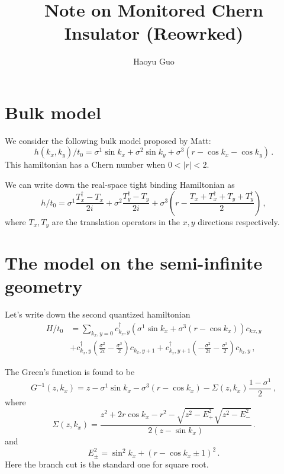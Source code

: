 \documentclass[aps,prx,preprint,amsmath,amssymb]{revtex4-2}
\begin{document}
\title{Note on Monitored Chern Insulator (Reowrked)}

\author{Haoyu Guo}



\maketitle


\section{Bulk model}

We consider the following bulk model proposed by Matt: 
\begin{equation}\label{}
  h(k_x,k_y)/t_0=\sigma^1 \sin k_x +\sigma^2 \sin k_y+\sigma^3\left(r-\cos k_x-\cos k_y\right)\,.
\end{equation} This hamiltonian has a Chern number when $0<|r|<2$.

We can write down the real-space tight binding Hamiltonian as 
\begin{equation}\label{}
  h/t_0=\sigma^1\frac{T_x^\dagger-T_x}{2i}+\sigma^2 \frac{T_y^\dagger -T_y}{2i}+\sigma^3 \left(r-\frac{T_x+T_x^\dagger+T_y+T_y^\dagger}{2}\right)\,,
\end{equation} where $T_x,T_y$ are the translation operators in the $x,y$ directions respectively. 

\section{The model on the semi-infinite geometry}

Let's write down the second quantized hamiltonian 
\begin{equation}\label{}
\begin{split}
  H/t_{0}&= \sum_{k_x,y=0} c_{k_x,y}^\dagger\left(\sigma^1 \sin k_x+\sigma^3 (r-\cos k_x)\right)c_{kx,y} \\
&+ c_{k_x,y}^\dagger \left(\frac{\sigma^2}{2i}-\frac{\sigma^3}{2}\right)c_{k_x,y+1}+c_{k_x,y+1}^\dagger\left(-\frac{\sigma^2}{2i}-\frac{\sigma^3}{2}\right)c_{k_x,y}\,,
\end{split}
\end{equation} 

The Green's function is found to be 
\begin{equation}\label{}
  G^{-1}(z,k_x)=z-\sigma^1 \sin k_x- \sigma^3(r-\cos k_x)-\Sigma(z,k_x)\frac{1-\sigma^1}{2}\,,
\end{equation} where 
\begin{equation}\label{}
  \Sigma(z,k_x)=\frac{z^2+2r\cos k_x-r^2-\sqrt{z^2-E_+^2}\sqrt{z^2-E_-^2}}{2(z-\sin k_x)}\,.
\end{equation} and 
\begin{equation}\label{}
   E_{\pm}^2= \sin^2 k_x+(r-\cos k_x \pm 1)^2\,.
\end{equation} Here the branch cut is the standard one for square root.
\end{document}
